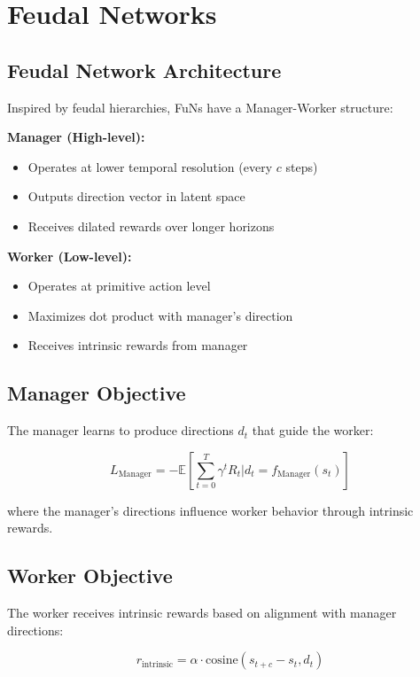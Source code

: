 \section{Feudal Networks}

\subsection{Feudal Network Architecture}

Inspired by feudal hierarchies, FuNs have a Manager-Worker structure:

\textbf{Manager (High-level):}
\begin{itemize}
    \item Operates at lower temporal resolution (every $c$ steps)
    \item Outputs direction vector in latent space
    \item Receives dilated rewards over longer horizons
\end{itemize}

\textbf{Worker (Low-level):}
\begin{itemize}
    \item Operates at primitive action level
    \item Maximizes dot product with manager's direction
    \item Receives intrinsic rewards from manager
\end{itemize}

\subsection{Manager Objective}

The manager learns to produce directions $d_t$ that guide the worker:

\begin{equation}
L_{\text{Manager}} = -\mathbb{E} \left[ \sum_{t=0}^T \gamma^t R_t \bigg| d_t = f_{\text{Manager}}(s_t) \right]
\end{equation}

where the manager's directions influence worker behavior through intrinsic rewards.

\subsection{Worker Objective}

The worker receives intrinsic rewards based on alignment with manager directions:

\begin{equation}
r_{\text{intrinsic}} = \alpha \cdot \text{cosine}(s_{t+c} - s_t, d_t)
\end{equation}

